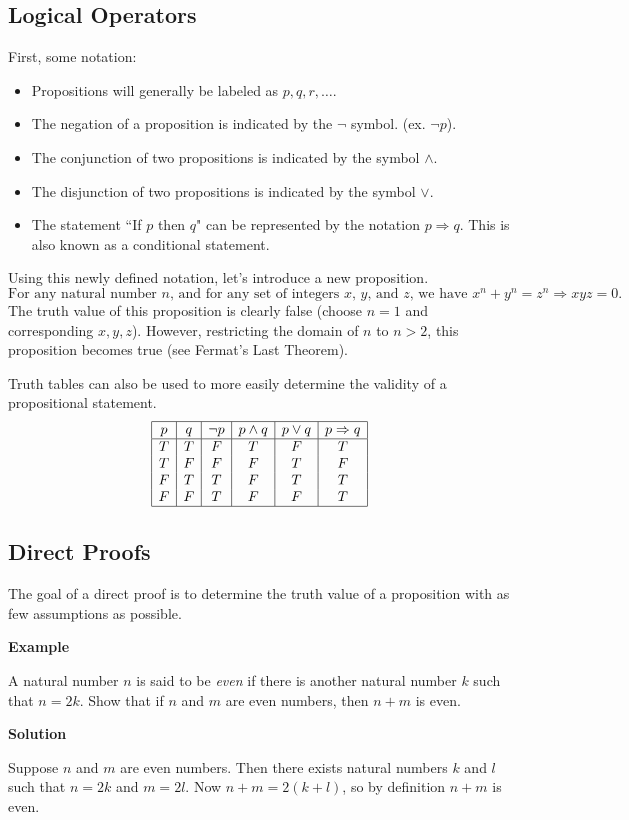 \documentclass{article}
\begin{document}
\subsection{Logical Operators}
    First, some notation:
    \begin{itemize}[itemsep = 0.2mm, parsep = 5pt, topsep = 5pt]
        \item Propositions will generally be labeled as $p, q, r, \dots$.
        \item The negation of a proposition is indicated by the $\neg$ symbol. (ex. $\neg p$).
        \item The conjunction of two propositions is indicated by the symbol $\land$.
        \item The disjunction of two propositions is indicated by the symbol $\lor$.
        \item The statement ``If $p$ then $q$" can be represented by the notation $p \Rightarrow q$. This is also known as a conditional statement.
    \end{itemize}
    Using this newly defined notation, let's introduce a new proposition. $$ \text{For any natural number $n$, and for any set of integers $x$, $y$, and $z$, we have $x^n + y^n = z^n \Rightarrow xyz = 0$.}$$ The truth value of this proposition is clearly false (choose $n = 1$ and corresponding $x, y, z$). However, restricting the domain of $n$ to $n > 2$, this proposition becomes true (see Fermat's Last Theorem).
    
    \vspace{1.5mm}
    Truth tables can also be used to more easily determine the validity of a propositional statement.
    $$\begin{array}{|c|c|c|c|c|c|}
        \hline
        p & q & \neg p & p \land q & p \lor q & p \Rightarrow q\\
        \hline
        T & T & F & T & F & T \\
        T & F & F & F & T & F \\
        F & T & T & F & T & T \\
        F & F & T & F & F & T \\
        \hline
    \end{array}$$

\subsection{Direct Proofs}
    The goal of a direct proof is to determine the truth value of a proposition with as few assumptions as possible.

    \vspace{1.5mm}
    \textbf{Example}
    
    A natural number $n$ is said to be \textit{even} if there is another natural number $k$ such that $n = 2k$. Show that if $n$ and $m$ are even numbers, then $n + m$ is even.
    
    \vspace{1.5mm}
    \textbf{Solution}
    
    Suppose $n$ and $m$ are even numbers. Then there exists natural numbers $k$ and $l$ such that $n = 2k$ and $m = 2l$. Now $n + m = 2(k + l)$, so by definition $n + m$ is even.
\end{document}
